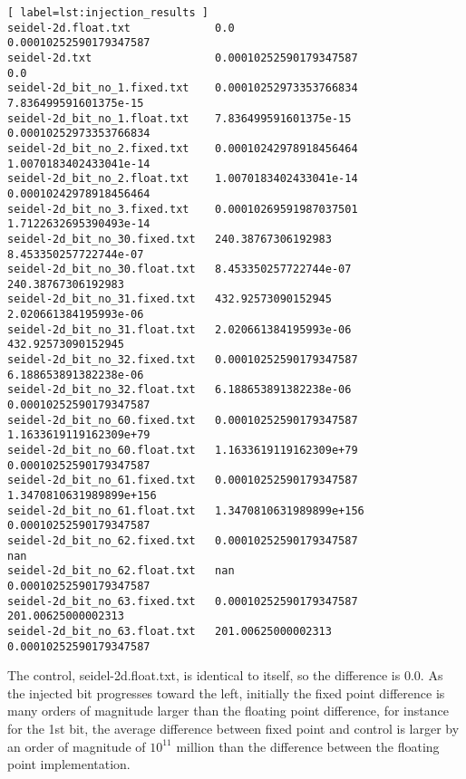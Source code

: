 \begin{verbatim}[ label=lst:injection_results ]
seidel-2d.float.txt             0.0                                     0.00010252590179347587
seidel-2d.txt                   0.00010252590179347587                  0.0
seidel-2d_bit_no_1.fixed.txt    0.00010252973353766834                  7.836499591601375e-15
seidel-2d_bit_no_1.float.txt    7.836499591601375e-15                   0.00010252973353766834
seidel-2d_bit_no_2.fixed.txt    0.00010242978918456464                  1.0070183402433041e-14
seidel-2d_bit_no_2.float.txt    1.0070183402433041e-14                  0.00010242978918456464
seidel-2d_bit_no_3.fixed.txt    0.00010269591987037501                  1.7122632695390493e-14
seidel-2d_bit_no_30.fixed.txt   240.38767306192983                      8.453350257722744e-07
seidel-2d_bit_no_30.float.txt   8.453350257722744e-07                   240.38767306192983
seidel-2d_bit_no_31.fixed.txt   432.92573090152945                      2.020661384195993e-06
seidel-2d_bit_no_31.float.txt   2.020661384195993e-06                   432.92573090152945
seidel-2d_bit_no_32.fixed.txt   0.00010252590179347587                  6.188653891382238e-06
seidel-2d_bit_no_32.float.txt   6.188653891382238e-06                   0.00010252590179347587
seidel-2d_bit_no_60.fixed.txt   0.00010252590179347587                  1.1633619119162309e+79
seidel-2d_bit_no_60.float.txt   1.1633619119162309e+79                  0.00010252590179347587
seidel-2d_bit_no_61.fixed.txt   0.00010252590179347587                  1.3470810631989899e+156
seidel-2d_bit_no_61.float.txt   1.3470810631989899e+156                 0.00010252590179347587
seidel-2d_bit_no_62.fixed.txt   0.00010252590179347587                  nan
seidel-2d_bit_no_62.float.txt   nan                                     0.00010252590179347587
seidel-2d_bit_no_63.fixed.txt   0.00010252590179347587                  201.00625000002313
seidel-2d_bit_no_63.float.txt   201.00625000002313                      0.00010252590179347587
\end{verbatim}



The control, seidel-2d.float.txt, is identical to itself, so the difference is 0.0. As the injected bit progresses toward the left, initially the fixed point difference is many orders of magnitude larger than the floating point difference, for instance for the 1st bit, the average difference between fixed point and control is larger by an order of magnitude of $10^{11}$ million than the difference between the floating point implementation. 


